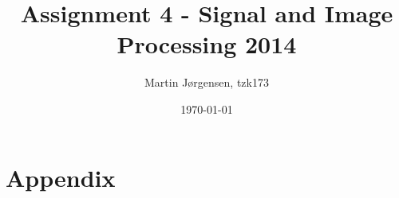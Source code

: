 \documentclass[a4paper,11pt]{article}
\title{Assignment 4 - Signal and Image Processing 2014}
\author{Martin Jørgensen, tzk173}
\date{\today}
\begin{document}
\maketitle

\tableofcontents
\pagebreak


%
%




\appendix
\section{Appendix}

\end{document}
